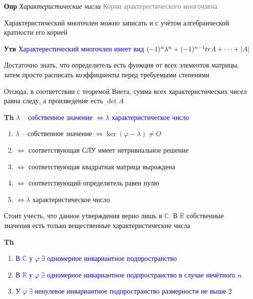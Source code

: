 \textbf{Опр} \textit{Характеристические числа} \textcolor{gray}{Корни арактерестического многочлена}

Характеристический многочлен можно записать и с учётом алгебраической кратности его корней

\textbf{Утв} \textcolor{blue}{Характерестический многочлен имеет
вид $(-1)^n \lambda^n + (-1)^{n-1} tr A + \dots + \abs{A}$}

Достаточно знать, что определитель есть функция от всех элементов матрицы, затем просто расписать коэффициенты
перед требуемыми степенями

Отсюда, в соответствии с теоремой Виета, сумма всех характеристических чисел равна следу, а произведение есть $\det A$

\textbf{Th} \textcolor{blue}{$\lambda$ -- собственное значение $\Leftrightarrow \lambda$ характеристическое число}

\begin{enumerate}
    \item $\lambda$ -- собственное значение $\Leftrightarrow \ker (\varphi - \lambda) \neq O$
    \item $\Leftrightarrow$ соответствующая СЛУ имеет нетривиальное решение
    \item $\Leftrightarrow$ соответствующая квадратная матрица вырождена
    \item $\Leftrightarrow$ соответствующий определитель равен нулю
    \item $\Leftrightarrow \lambda$ характеристическое число
\end{enumerate}

Стоит учесть, что данное утверждения верно лишь в $\mathbb{C}$.
В $\mathbb{R}$ собственные значения есть только вещественные характеристические числа

\textbf{Th} \textcolor{blue}{
    \begin{enumerate}
        \item В $\mathbb{C}$ у $\varphi~\exists$ одномерное инвариантное подпространство
        \item В $\mathbb{R}$ у $\varphi~\exists$ одномерное инвариантное подпространство в случае нечётного $n$
        \item У $\varphi~\exists$ ненулевое инвариантное подпространство размерности не выше 2
    \end{enumerate}         }

